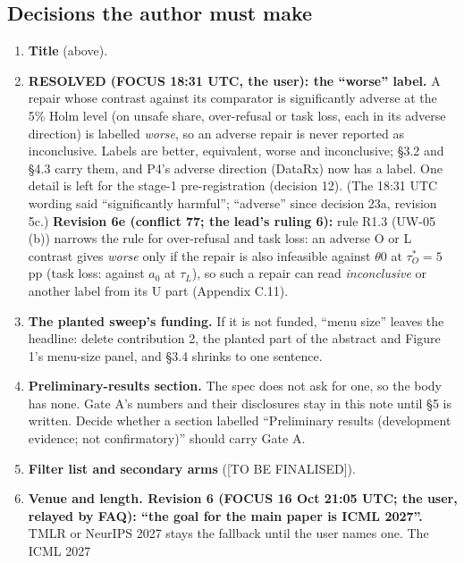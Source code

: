 \documentclass{article}
\theoremstyle{plain}
\theoremstyle{definition}
\theoremstyle{remark}
\begin{document}
\subsection{Decisions the author must make}

\begin{enumerate}
  \item \textbf{Title} (above).
  \item \textbf{RESOLVED (FOCUS 18:31 UTC, the user): the ``worse'' label.} A
        repair whose contrast against its comparator is significantly adverse at
        the 5\% Holm level (on unsafe share, over-refusal or task loss, each in
        its adverse direction) is labelled \emph{worse}, so an adverse repair is
        never reported as inconclusive. Labels are better, equivalent, worse and
        inconclusive; \S{}3.2 and \S{}4.3 carry them, and P4's adverse direction
        (DataRx) now has a label. One detail is left for the stage-1
        pre-registration (decision 12). (The 18:31 UTC wording said
        ``significantly harmful''; ``adverse'' since decision 23a, revision 5c.)
        \textbf{Revision 6e (conflict 77; the lead's ruling 6):} rule R1.3
        (UW-05 (b)) narrows the rule for over-refusal and task loss: an adverse
        O or L contrast gives \emph{worse} only if the repair is also infeasible
        against $\theta$0 at $\tau_O^* = 5$ pp (task loss: against $a_0$ at
        $\tau_{L}$), so such a repair can read \emph{inconclusive} or another
        label from its U part (Appendix C.11).
  \item \textbf{The planted sweep's funding.} If it is not funded, ``menu size''
        leaves the headline: delete contribution 2, the planted part of the
        abstract and Figure 1's menu-size panel, and \S{}3.4 shrinks to one
        sentence.
  \item \textbf{Preliminary-results section.} The spec does not ask for one, so
        the body has none. Gate A's numbers and their disclosures stay in this
        note until \S{}5 is written. Decide whether a section labelled
        ``Preliminary results (development evidence; not confirmatory)'' should
        carry Gate A.
  \item \textbf{Filter list and secondary arms} ([TO BE FINALISED]).
  \item \textbf{Venue and length. Revision 6 (FOCUS 16 Oct 21:05 UTC; the user,
        relayed by FAQ): ``the goal for the main paper is ICML 2027''.} TMLR or
        NeurIPS 2027 stays the fallback until the user names one. The ICML 2027

\end{enumerate}
\end{document}
